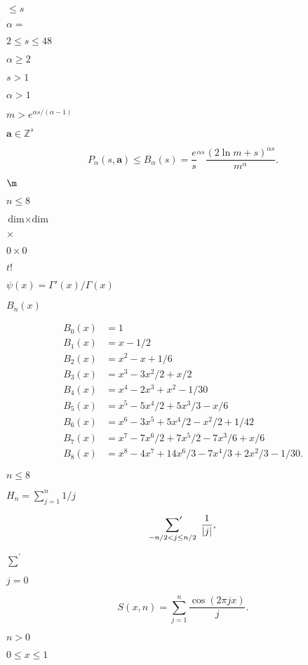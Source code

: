 \documentclass{article}
\begin{document}
$\le s$
\pagebreak

$\alpha= {}$
\pagebreak

$2 \le s \le48$
\pagebreak

$\alpha\ge2$
\pagebreak

$s > 1$
\pagebreak

$\alpha> 1$
\pagebreak

$m >
e^{\alpha s/(\alpha-1)}$
\pagebreak

$\mathbf{a} \in\mathbb Z^s$
\pagebreak

\[  P_{\alpha}(s, \mathbf{a})  \le  B_{\alpha}(s)  = \frac{e}{s}^{\alpha s} \frac{(2\ln m + s)^{\alpha s}}{m^{\alpha}}.
\]
\pagebreak

$\m$
\pagebreak

$n \leq 8$
\pagebreak

$\text{dim}\times\text{dim}$
\pagebreak

$\times$
\pagebreak

$0\times 0$
\pagebreak

$t!$
\pagebreak

$\psi(x) = \Gamma'(x) / \Gamma(x)$
\pagebreak

$B_n(x)$
\pagebreak

\begin{align*}B_0(x) &= 1  \\
B_1(x) &= x - 1/2  \\
B_2(x) &= x^2-x+1/6  \\
B_3(x) &= x^3 - 3x^2/2 + x/2  \\
B_4(x) &= x^4-2x^3+x^2-1/30 \\
B_5(x) &= x^5 - 5x^4/2 + 5x^3/3 - x/6  \\
B_6(x) &= x^6-3x^5+5x^4/2-x^2/2+1/42  \\
B_7(x) &= x^7 - 7x^6/2 +  7x^5/2 - 7x^3/6 + x/6  \\
B_8(x) &= x^8-4x^7+14x^6/3 - 7x^4/3 +2x^2/3-1/30.
\end{align*}
\pagebreak

$n \le 8$
\pagebreak

$H_n  = \sum_{j=1}^n 1/j$
\pagebreak

\[\sideset{}{'}\sum_{-n/2<j\le n/2}\; \frac 1{|j|},
\]
\pagebreak

$\sum^\prime$
\pagebreak

$j=0$
\pagebreak

\[S(x, n) = \sum_{j=1}^{n} \frac{\cos(2\pi j x)}{j}.
\]
\pagebreak

$n>0$
\pagebreak

$0 \le x \le 1$
\pagebreak
\end{document}
